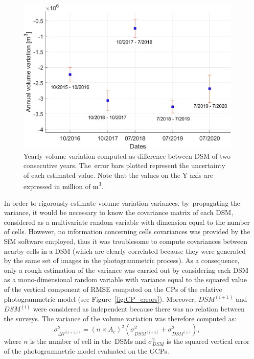 \begin{figure}
	\centering
	\includegraphics[width=0.8\columnwidth]{figures/chapter3/volumes.png}
	\caption{Yearly volume variation computed as difference between DSM of two consecutive years. The~error bars plotted represent the uncertainty of each estimated value. Note that the values on the Y axis are expressed in million of \si{\cubic\meter}.}
	\label{fig:volumes}
\end{figure}

In order to rigorously estimate volume variation variances, by~propagating the variance, it would be  necessary to know the covariance matrix of each DSM, considered as a multivariate random variable with dimension equal to the number of cells.
However, no information concerning cells covariances was provided by the SfM software employed, thus it was troublesome to compute covariances between nearby cells in a DSM (which are clearly correlated because they were generated by the same set of images in the photogrammetric process).
As a consequence, only a rough estimation of the variance was carried out by considering each DSM as a mono-dimensional random variable with variance equal to the squared value of the vertical component of RMSE computed on the CPs of the relative photogrammetric model (see Figure~\ref{fig:CP_errors}).
Moreover, $ DSM^{(i+1)} $ and $ DSM^{(i)} $ were considered as independent because there was no relation between the surveys.
The variance of the volume variation was therefore computed as:
\begin{equation}
	\sigma^2_{\Delta V^{(i+1,i)}}  = {(n \times A_c)}^2 \left( \sigma^2 _{DSM^{(i+1)}} + \sigma^2_{DSM^{(i)}} \right), 
	\label{eq:volVarProp}
\end{equation}
where $ n $ is the number of cell in the~DSMs and $ \sigma^2 _{DSM}$ is the squared vertical error of the photogrammetric model evaluated on the GCPs.

